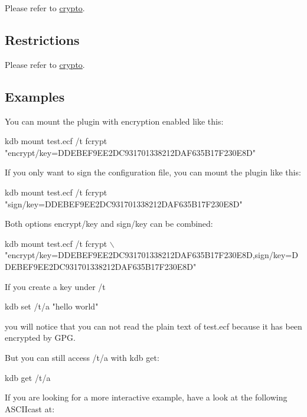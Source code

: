 Please refer to \hyperlink{md_src_plugins_crypto_README_src_plugins_crypto_README_md}{crypto}.

\subsection*{Restrictions}

Please refer to \hyperlink{md_src_plugins_crypto_README_src_plugins_crypto_README_md}{crypto}.

\subsection*{Examples}

You can mount the plugin with encryption enabled like this\+:


\begin{DoxyCode}
kdb mount test.ecf /t fcrypt "encrypt/key=DDEBEF9EE2DC931701338212DAF635B17F230E8D"
\end{DoxyCode}


If you only want to sign the configuration file, you can mount the plugin like this\+:


\begin{DoxyCode}
kdb mount test.ecf /t fcrypt "sign/key=DDEBEF9EE2DC931701338212DAF635B17F230E8D"
\end{DoxyCode}


Both options {\ttfamily encrypt/key} and {\ttfamily sign/key} can be combined\+:


\begin{DoxyCode}
kdb mount test.ecf /t fcrypt \(\backslash\)
  "encrypt/key=DDEBEF9EE2DC931701338212DAF635B17F230E8D,sign/key=DDEBEF9EE2DC931701338212DAF635B17F230E8D"
\end{DoxyCode}


If you create a key under {\ttfamily /t}


\begin{DoxyCode}
kdb set /t/a "hello world"
\end{DoxyCode}


you will notice that you can not read the plain text of {\ttfamily test.\+ecf} because it has been encrypted by G\+PG.

But you can still access {\ttfamily /t/a} with {\ttfamily kdb get}\+:


\begin{DoxyCode}
kdb get /t/a
\end{DoxyCode}


If you are looking for a more interactive example, have a look at the following A\+S\+C\+I\+Icast at\+:

